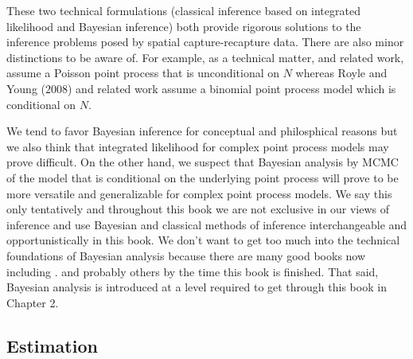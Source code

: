 These two technical formulations (classical inference based on
integrated likelihood and Bayesian inference) both provide rigorous solutions to
the inference problems posed by spatial capture-recapture data.  There
are also minor distinctions to be aware of. For example,
as a technical matter, \citet{borchers_efford:2008} and related work, assume
a Poisson point process that is unconditional on $N$ whereas Royle and
Young (2008) and related work assume a binomial point process model
which is conditional on $N$.

We tend to favor Bayesian inference for conceptual and philosphical
reasons but we also think that  integrated likelihood
for complex point process models may prove difficult. On the other
hand, we suspect that Bayesian
analysis by MCMC
of the model that is conditional on the underlying point process will
prove to be more versatile and generalizable for complex point process
models. We say this only
tentatively and throughout this book we are not exclusive in our views
of inference and use Bayesian and classical methods of inference
interchangeable and opportunistically in this book.
We don't want to get too much into the technical foundations of
Bayesian analysis because there are many good books now including
\citet{link_barker:2010}.  \citet{kery:2010, mccarthy:2007,
  king_etal:2009} and probably others by the time this book is
finished. That said,  Bayesian analysis is introduced at a
level required to get through this book in Chapter 2.





\subsection{Estimation}


